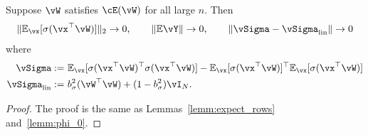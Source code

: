 \begin{lemma}\label{lemma:bar_sigma_app}
Suppose $\vW$ satisfies $\cE(\vW)$ for all large $n$. Then
\begin{align}
\|\E_{\vx}[\sigma(\vx^\top\vW)]\|_2 \to 0,
\qquad \|\E\vY\| \to 0,
\qquad \norm{\vSigma-\vSigma_{\mathrm{lin}}} \to 0
\end{align}
        where
\begin{align}
	\vSigma:=~&\E_{\vx}[\sigma(\vx^\top\vW)^\top\sigma(\vx^\top\vW)]-\E_{\vx}[\sigma(\vx^\top\vW)]^\top\E_{\vx}[\sigma(\vx^\top\vW)]\\
	\vSigma_{\mathrm{lin}}:=~& b_\sigma^2(\vW^\top \vW)+(1-b_\sigma^2)\vI_N.
\end{align}
\end{lemma}
\begin{proof}
The proof is the same as Lemmas~\ref{lemm:expect_rows} and~\ref{lemm:phi_0}.
\end{proof}

